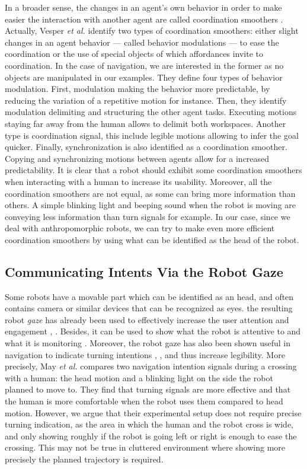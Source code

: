 \documentclass[a4paper,11pt,twoside]{StyleThese}
\begin{document}
In a broader sense, the changes in an agent's own behavior in order to make easier the interaction with another agent are called coordination smoothers \cite{vesper_minimal_2010}. Actually, Vesper \textit{et al.} identify two types of coordination smoothers: either slight changes in an agent behavior --- called behavior modulations --- to ease the coordination or the use of special objects of which affordances invite to coordination. In the case of navigation, we are interested in the former as no objects are manipulated in our examples. They define four types of behavior modulation. First, modulation making the behavior more predictable, by reducing the variation of a repetitive motion for instance. Then, they identify modulation delimiting and structuring the other agent tasks. Executing motions staying far away from the human allows to delimit both workspaces. Another type is coordination signal, this include legible motions allowing to infer the goal quicker. Finally, synchronization is also identified as a coordination smoother. Copying and synchronizing motions between agents allow for a increased predictability. It is clear that a robot should exhibit some coordination smoothers when interacting with a human to increase its usability. Moreover, all the coordination smoothers are not equal, as some can bring more information than others. A simple blinking light and beeping sound when the robot is moving are conveying less information than turn signals for example. In our case, since we deal with anthropomorphic robots, we can try to make even more efficient coordination smoothers by using what can be identified as the head of the robot.

\subsection{Communicating Intents Via the Robot Gaze} 
Some robots have a movable part which can be identified as an head, and often contains camera or similar devices that can be recognized as eyes. the resulting robot \textit{gaze} has already been used to effectively increase the user attention and engagement \cite{mutlu_storytelling_2006}, \cite{zaraki_designing_2014}. Besides, it can be used to show what the robot is attentive to and what it is monitoring \cite{breazeal2005effects}. Moreover, the robot gaze has also been shown useful in navigation to indicate turning intentions \cite{lu_towards_2013}, \cite{may_show_2015}, and thus increase legibility. More precisely, May \textit{et al.} compares two navigation intention signals during a crossing with a human: the head motion and a blinking light on the side the robot planned to move to. They find that turning signals are more effective and that the human is more comfortable when the robot uses them compared to head motion. However, we argue that their experimental setup does not require precise turning indication, as the area in which the human and the robot cross is wide, and only showing roughly if the robot is going left or right is enough to ease the crossing. This may not be true in cluttered environment where showing more precisely the planned trajectory is required. 
\end{document}
